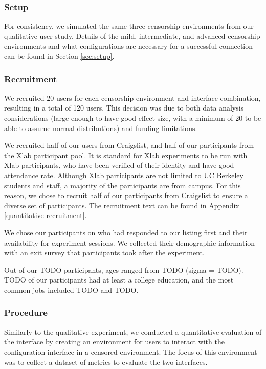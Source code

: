 \documentclass{template}
\begin{document}
\subsubsection{Setup}
For consistency, we simulated the same three censorship environments from 
our qualitative user study. Details of the mild, intermediate, and advanced 
censorship environments and what configurations are necessary for a 
successful connection can be found in Section \ref{sec:setup}. 

\subsubsection{Recruitment}
We recruited 20 users for each censorship environment
and interface combination, resulting in a total of 120 users. This decision 
was due to both data analysis considerations (large enough to have good effect size, 
with a minimum of 20 to be able to assume normal distributions) and funding
limitations. 

We recruited half of our users from Craigslist, and half of our participants from 
the Xlab participant pool. It is standard for Xlab experiments to be run with Xlab
participants, who have been verified of their identity and have good attendance
rate. Although Xlab participants are not limited to UC Berkeley students and staff,
a majority of the participants are from campus. For this reason, we chose to recruit 
half of our participants from Craigslist to ensure a diverse set of participants. 
The recruitment text can be found in Appendix \ref{quantitative-recruitment}. 

We chose our participants on who had responded to our listing first and their
availability for experiment sessions. We collected their demographic information
with an exit survey that participants took after the experiment. 

Out of our {\color {red} TODO} participants, ages ranged from {\color {red} TODO}
(sigma = {\color {red} TODO}). {\color {red} TODO} of our participants had at least
a college education, and the most common jobs included {\color {red} TODO} and
{\color {red} TODO}. 

\subsubsection{Procedure}
Similarly to the qualitative experiment, we conducted a quantitative evaluation 
of the interface by creating an environment  for users to interact with the 
configuration interface in a censored environment. The focus of this environment 
was to collect a dataset of metrics to evaluate the two interfaces. 
\end{document}
